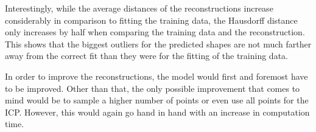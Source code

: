 Interestingly, while the average distances of the reconstructions increase considerably in comparison to fitting the training data, the Hausdorff distance only increases by half when comparing the training data and the reconstruction. 
This shows that the biggest outliers for the predicted shapes are not much farther away from the correct fit than they were for the fitting of the training data.

In order to improve the reconstructions, the model would first and foremost have to be improved. 
Other than that, the only possible improvement that comes to mind would be to sample a higher number of points or even use all points for the ICP.
However, this would again go hand in hand with an increase in computation time.
